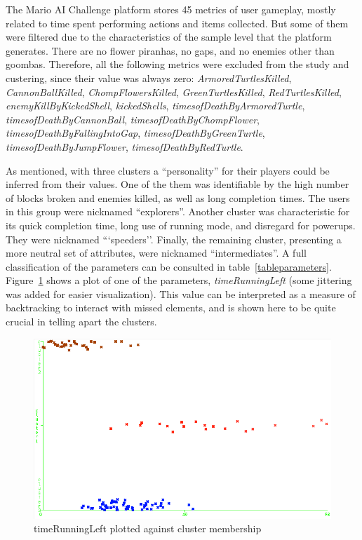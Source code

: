 \documentclass[conference]{IEEEtran}
\begin{document}
The Mario AI Challenge platform stores 45 metrics of user gameplay, mostly related to time spent performing actions and items collected. But some of them were filtered due to the characteristics of the sample level that the platform generates. There are no flower piranhas, no gaps, and no enemies other than goombas. Therefore, all the following metrics were excluded from the study and custering, since their value was always zero: \textit{ArmoredTurtlesKilled}, \textit{CannonBallKilled}, \textit{ChompFlowersKilled}, \textit{GreenTurtlesKilled}, \textit{RedTurtlesKilled}, \textit{enemyKillByKickedShell}, \textit{kickedShells}, \textit{timesofDeathByArmoredTurtle}, \textit{timesofDeathByCannonBall}, \textit{timesofDeathByChompFlower}, \textit{timesofDeathByFallingIntoGap}, \textit{timesofDeathByGreenTurtle}, \textit{timesofDeathByJumpFlower}, \textit{timesofDeathByRedTurtle}.

As mentioned, with three clusters a ``personality'' for their players could be inferred from their values. One of the them was identifiable by the high number of blocks broken and enemies killed, as well as long completion times. The users in this group were nicknamed ``explorers''. Another cluster was characteristic for its quick completion time, long use of running mode, and disregard for powerups. They were nicknamed ```speeders''. Finally, the remaining cluster, presenting a more neutral set of attributes, were nicknamed ``intermediates''. A full classification of the parameters can be consulted in table~\ref{tableparameters}. Figure~\ref{wekaplot} shows a plot of one of the parameters, \textit{timeRunningLeft} (some jittering was added for easier visualization). This value can be interpreted as a measure of backtracking to interact with missed elements, and is shown here to be quite crucial in telling apart the clusters. 

\begin{figure}[htp]
\centerline{\includegraphics[width=0.9\columnwidth]{timeRunningLeft_.png}}
\caption{timeRunningLeft plotted against cluster membership}
\label{wekaplot}
\end{figure}
\end{document}
